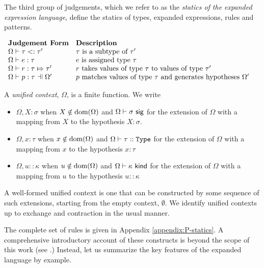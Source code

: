 The third group of judgements, which we refer to as the \emph{statics of the expanded expression language}, define the statics of types, expanded expressions, rules and patterns.

\vspace{5px}
$\begin{array}{ll}
\textbf{Judgement Form} & \textbf{Description}\\
\issubtypePX{\tau}{\tau'} & \text{$\tau$ is a subtype of $\tau'$}\\
\hastypeP{\Omega}{e}{\tau} & \text{$e$ is assigned type $\tau$}\\
\ruleTypeP{\Omega}{r}{\tau}{\tau'} & \text{$r$ takes values of type $\tau$ to values of type $\tau'$}\\
\patTypeP{\Omega'}{p}{\tau} & \text{$p$ matches values of type $\tau$ and generates hypotheses $\Omega'$} 
\end{array}$
\vspace{5px}


A \emph{unified context}, $\Omega$, is a finite function. 
We write
\begin{itemize}
\item $\Omega, X : \sigma$ when $X \notin \text{dom}(\Omega)$ and $\Omega \vdash \sigma~\mathsf{sig}$ for the extension of $\Omega$ with a mapping from $X$ to the hypothesis $X : \sigma$.
\item $\Omega, x : \tau$ when $x \notin \text{dom}(\Omega)$ and $\Omega \vdash \tau :: \texttt{Type}$ for the extension of $\Omega$ with a mapping from $x$ to the hypothesis $x : \tau$
\item $\Omega, u :: \kappa$ when $u \notin \text{dom}(\Omega)$ and $\Omega \vdash \kappa~\mathsf{kind}$ for the extension of $\Omega$ with a mapping from $u$ to the hypothesis $u :: \kappa$
\end{itemize}
A well-formed unified context is one that can be constructed by some sequence of such extensions, starting from the empty context, $\emptyset$. We identify unified contexts up to exchange and contraction in the usual manner.

The complete set of rules is given in Appendix \ref{appendix:P-statics}. A comprehensive introductory account of these constructs is beyond the scope of this work (see \cite{pfpl}.) Instead, let us summarize the key features of the expanded language by example. 

